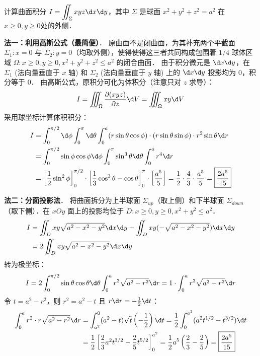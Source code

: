 \documentclass[12pt, a4paper, oneside, UTF8]{ctexbook}
\begin{document}
\begin{example}
    计算曲面积分 $I = \displaystyle\iint_\Sigma xyz \d x \d y$，其中 $\Sigma$ 是球面 $x^2+y^2+z^2=a^2$ 在$x\ge 0,y\ge 0$处的外侧．
\end{example}
\begin{solution}
    \textbf{法一：利用高斯公式（最简便）}．
    原曲面不是闭曲面，为其补充两个平截面 $\Sigma_1: x=0$ 与 $\Sigma_2: y=0$（均取外侧），使得使得这三者共同构成包围着 $1/4$ 球体区域 $\Omega: x \ge 0, y \ge 0, x^2+y^2+z^2 \le a^2$ 的闭合曲面．
    由于积分微元是 $\d x \d y$，在 $\Sigma_1$ (法向量垂直于 $x$ 轴) 和 $\Sigma_2$ (法向量垂直于 $y$ 轴) 上的 $\d x \d y$ 投影均为 0，积分等于 0．
    由高斯公式，原积分可化为体积分（注意只对 $z$ 求导）：
    \[ I = \iiint_\Omega \frac{\partial(xyz)}{\partial z} \d V = \iiint_\Omega xy \d V \]
    采用球坐标计算体积积分：
    \begin{align*}
        I &= \int_0^{\pi/2} \d \phi \int_0^\pi \d \theta \int_0^a (r\sin\theta\cos\phi)\cdot(r\sin\theta\sin\phi) \cdot r^2\sin\theta \d r \\
          &= \int_0^{\pi/2} \sin\phi\cos\phi \d \phi \int_0^\pi \sin^3\theta \d \theta \int_0^a r^4 \d r \\
          &= \left[\frac{1}{2}\sin^2\phi\right]_0^{\pi/2} \cdot \left[ \frac{1}{3}\cos^3\theta - \cos\theta \right]_0^\pi \cdot \left[\frac{a^5}{5}\right] = \frac{1}{2} \cdot \frac{4}{3} \cdot \frac{a^5}{5} = \boxed{\frac{2a^5}{15}}
    \end{align*}

    \textbf{法二：分面投影法}．
    将曲面拆分为上半球面 $\Sigma_{up}$（取上侧）和下半球面 $\Sigma_{down}$（取下侧）．在 $xOy$ 面上的投影均位于 $D: x \ge 0, y \ge 0, x^2+y^2 \le a^2$．
    \begin{align*}
        I &= \iint_{D} xy\sqrt{a^2-x^2-y^2} \d x \d y - \iint_{D} xy(-\sqrt{a^2-x^2-y^2}) \d x \d y \\
          &= 2 \iint_{D} xy\sqrt{a^2-x^2-y^2} \d x \d y
    \end{align*}
    转为极坐标：
    \begin{align*}
        I &= 2 \int_0^{\pi/2} \sin\theta\cos\theta \d\theta \int_0^a r^3\sqrt{a^2-r^2} \d r = 1 \cdot \int_0^a r^3\sqrt{a^2-r^2} \d r \\
    \end{align*}
    令 $t = a^2-r^2$，则 $r^2 = a^2-t$ 且 $r \d r = -\frac{1}{2} \d t$：
    \begin{align*}
        \int_0^a r^2 \cdot r\sqrt{a^2-r^2} \d r &= \int_{a^2}^0 (a^2-t)\sqrt{t} \left(-\frac{1}{2}\right) \d t = \frac{1}{2} \int_0^{a^2} (a^2 t^{1/2} - t^{3/2}) \d t \\
        &= \frac{1}{2} \left[ \frac{2}{3}a^2 t^{3/2} - \frac{2}{5} t^{5/2} \right]_0^{a^2} = \frac{1}{2} a^5 \left(\frac{2}{3} - \frac{2}{5}\right) = \boxed{\frac{2a^5}{15}}
    \end{align*}
\end{solution}
\end{document}
